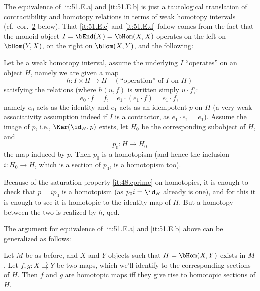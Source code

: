 The equivalence of \ref{it:51.E.a} and \ref{it:51.E.b} is just a
tautological translation of contractibility and homotopy relations in
terms of weak homotopy intervals \bJ{} (cf.\ cor.\ \hyperref[cor:51.E.2]{2}
below). That \ref{it:51.E.c} and \ref{it:51.E.d} follow comes from the
fact that the monoid object $I=\bEnd(X)=\bHom(X,X)$ operates on the
left on $\bHom(Y,X)$, on the right on $\bHom(X,Y)$, and the following:
\begin{corollarynum}\label{cor:51.E.1}
  Let \bI{} be a weak homotopy interval, assume the underlying $I$
  ``operates'' on an object $H$, namely we are given a map
  \[ h:I\times H\to H\quad(\text{``operation'' of $I$ on $H$})\]
  satisfying the relations \textup(where $h(u,f)$ is written simply
  $u\cdot f$\textup{):}
  \[ e_0 \cdot f = f, \quad e_1\cdot (e_1 \cdot f) = e_1 \cdot f,\]
  namely $e_0$ acts as the identity and $e_1$ acts as an idempotent
  $p$ on $H$ \textup(a very weak associativity assumption indeed if
  $I$ is a contractor, as $e_1\cdot e_1=e_1$\textup). Assume the image
  of $p$, i.e., $\Ker(\id_H,p)$ exists, let $H_0$ be the corresponding
  subobject of $H$, and
  \[p_0:H\to H_0\]
  the map induced by $p$. Then $p_0$ is a homotopism \textup(and hence
  the inclusion $i:H_0\to H$, which is a section of $p_0$, is a
  homotopism too\textup).
\end{corollarynum}

Because of the saturation property \ref{it:48.cprime} on homotopies, it
is enough to check that $p=ip_0$ is a homotopism (as $p_0i=\id_H$
already is one), and for this it is enough to see it is homotopic to
the identity map of $H$. But a homotopy between the two is realized by
$h$, qed.

The argument for equivalence of \ref{it:51.E.a} and \ref{it:51.E.b}
above can be generalized as follows:
\begin{corollarynum}\label{cor:51.E.2}
  Let $M$ be as before, and $X$ and $Y$ objects such that $H =
  \bHom(X,Y)$ exists in $M$. Let $f,g:X\rightrightarrows Y$ be two
  maps, which we'll identify to the corresponding sections of
  $H$. Then $f$ and $g$ are homotopic maps if{f} they give rise to
  homotopic sections of $H$.
\end{corollarynum}

